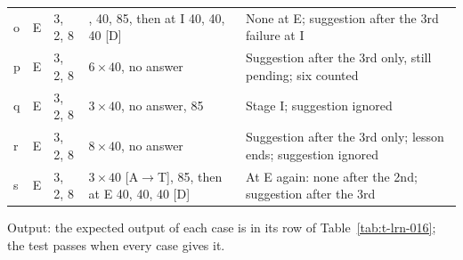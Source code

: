 \documentclass[12pt, titlepage]{article}
\begin{document}
\begin{enumerate}
\begin{table}[htbp]
\begin{tabularx}{\textwidth}{@{}l l l
  >{\raggedright\arraybackslash\hsize=0.8\hsize}X
  >{\raggedright\arraybackslash\hsize=1.2\hsize}X@{}}
o & E & 3, 2, 8 & 40, 40, 85, then at I 40, 40, 40 [D] & None at E;
suggestion after the 3rd failure at I\\
p & E & 3, 2, 8 & $6 \times 40$, no answer & Suggestion after the 3rd
only, still pending; six counted\\
q & E & 3, 2, 8 & $3 \times 40$, no answer, 85 & Stage I; suggestion
ignored\\
r & E & 3, 2, 8 & $8 \times 40$, no answer & Suggestion after the 3rd
only; lesson ends; suggestion ignored\\
s & E & 3, 2, 8 & $3 \times 40$ [A$\to$T], 85, then at E 40, 40, 40 [D] &
At E again: none after the 2nd; suggestion after the 3rd\\
\bottomrule
\end{tabularx}
\end{table}

Output: the expected output of each case is in its row of
Table~\ref{tab:t-lrn-016}; the test passes when every case gives it.


\end{enumerate}
\end{document}
